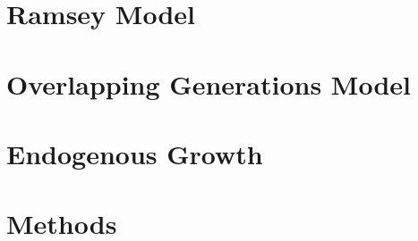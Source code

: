 \documentclass{article}
\begin{document}
\maketitle

\newpage
\section{Ramsey Model}

\newpage

\section{Overlapping Generations Model}

\newpage

\section{Endogenous Growth}

\newpage

\section{Methods}

\end{document}
